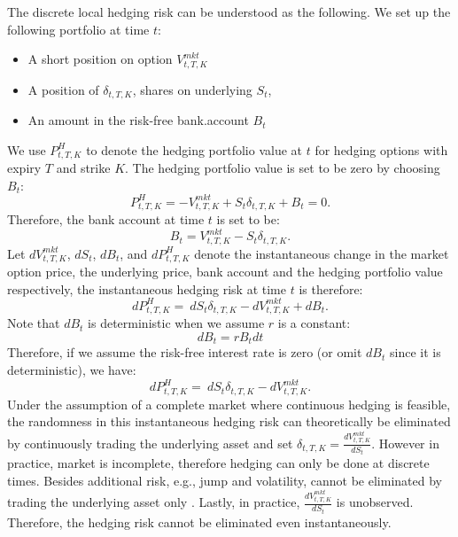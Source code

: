 \documentclass[letterpaper,12pt,titlepage,oneside,final]{book}
\numberwithin{equation}{section}
\theoremstyle{definition}
\newcommand{\Vmkt}{V^{mkt}}
\newcommand{\Smkt}{S}
\begin{document}
The discrete local hedging risk can be understood as the following.
We set up the following portfolio at time $t$:
\begin{itemize}
\item A short position on option $\Vmkt_{t,T,K}$
\item  A position of $\delta_{t,T,K}$, shares on underlying $\Smkt_{t}$,
\item An amount in the risk-free bank.account $B_t$
\end{itemize}

We use $P^{H}_{t,T,K}$ to denote the hedging portfolio value at $t$ for hedging options with expiry $T$ and strike $K$.
The hedging portfolio value is set to be zero by choosing $B_t$:
\[
    P^{H}_{t,T,K}=-\Vmkt_{t,T,K}+\Smkt_{t} \delta_{t,T,K} +B_t=0.
\]
Therefore, the bank account  at time $t$ is set to be: 
\[
    B_t=\Vmkt_{t,T,K}-\Smkt_{t} \delta_{t,T,K}.
\]
Let  $d\Vmkt_{t,T,K}$, $d\Smkt_{t}$, $d B_t$, and $d P^{H}_{t,T,K}$ denote the instantaneous change in the market option price, the underlying price,  bank account and the hedging portfolio value respectively, the instantaneous hedging risk at time $t$ is therefore:
\begin{equation}
    d P^{H}_{t,T,K}=\ d\Smkt_{t} \delta_{t,T,K}-d \Vmkt_{t,T,K}+ d B_t.
\end{equation}
Note that $d B_t$ is deterministic when we assume $r$ is a constant:
\[
    d B_t=r B_{t} dt
\]
Therefore, if we assume the risk-free interest rate is zero (or omit $d B_t$ since it is deterministic), we have:
\begin{equation}\label{eq:HE}
    d P^{H}_{t,T,K}=\ d\Smkt_{t} \delta_{t,T,K}-d \Vmkt_{t,T,K}.
\end{equation}
Under the assumption of a complete market where continuous hedging is feasible, the randomness in this instantaneous hedging risk can theoretically be eliminated by continuously trading the underlying asset and set $\delta_{t,T,K}=\frac{d \Vmkt_{t,T,K}}{d\Smkt_{t}}$. However in practice, market is incomplete, therefore hedging can only be done at discrete times.
Besides additional risk, e.g., jump and volatility, cannot be eliminated by trading the underlying asset only \cite{heston1993closed,gatheral2011volatility}. 
Lastly, in practice, $\frac{d \Vmkt_{t,T,K}}{d\Smkt_{t}}$ is unobserved.  Therefore, the hedging risk cannot be eliminated even instantaneously. 
\end{document}
